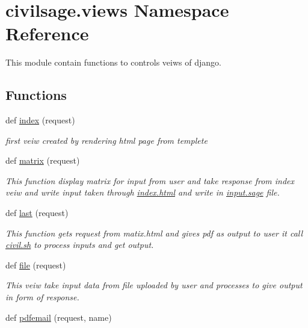 \hypertarget{namespacecivilsage_1_1views}{}\section{civilsage.\+views Namespace Reference}
\label{namespacecivilsage_1_1views}


This module contain functions to controls veiws of django.  


\subsection*{Functions}
\begin{DoxyCompactItemize}
\item 
def \hyperlink{namespacecivilsage_1_1views_a7b4fd4478a312ce8e35a192159c59de9}{index} (request)
\begin{DoxyCompactList}\small\item\em first veiw created by rendering html page from templete \end{DoxyCompactList}\item 
def \hyperlink{namespacecivilsage_1_1views_a8b58c93a9c82e84143c43dafaa744a4b}{matrix} (request)
\begin{DoxyCompactList}\small\item\em This function display matrix for input from user and take response from index veiw and write input taken through \hyperlink{index_8html}{index.\+html} and write in \hyperlink{input_8sage}{input.\+sage} file. \end{DoxyCompactList}\item 
def \hyperlink{namespacecivilsage_1_1views_aed47fb0740a2fa14693f697905788719}{last} (request)
\begin{DoxyCompactList}\small\item\em This function gets request from matix.\+html and gives pdf as output to user it call \hyperlink{civil_8sh}{civil.\+sh} to process inputs and get output. \end{DoxyCompactList}\item 
def \hyperlink{namespacecivilsage_1_1views_a32de127956738677913352a2db84ecdb}{file} (request)
\begin{DoxyCompactList}\small\item\em This veiw take input data from file uploaded by user and processes to give output in form of response. \end{DoxyCompactList}\item 
def \hyperlink{namespacecivilsage_1_1views_a9914ff19f8e15ccab1a07eaeac8cfb21}{pdfemail} (request, name)

\end{DoxyCompactItemize}
